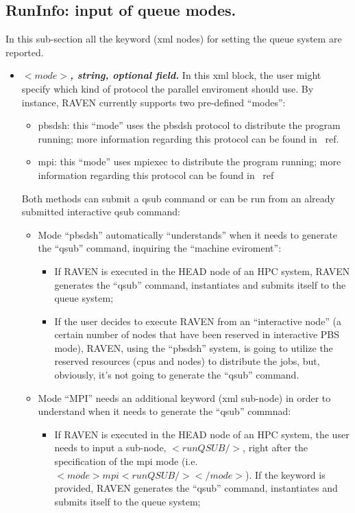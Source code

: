 \subsection{RunInfo: input of queue modes.}
\label{subsec:runinfoModes}
In this sub-section all  the keyword (xml nodes) for setting the queue system are reported.
\begin{itemize}
\item $<mode>$\textbf{\textit{, string, optional field.}} In this xml block, the user might specify which kind of protocol the parallel enviroment should use. By instance, RAVEN currently supports two pre-defined ``modes'':
  \begin{itemize}
    \item pbsdsh: this ``mode'' uses the pbsdsh protocol to distribute the program running; more information regarding this protocol can be found in ~ref{}. 
    \item mpi: this ``mode'' uses mpiexec to distribute the program running; more information regarding this protocol can be found in ~ref{}
   \end{itemize}
Both methods can submit a qsub command or can be run from an already submitted interactive qsub command:
     \begin{itemize}
        \item Mode ``pbsdsh'' automatically ``understands'' when it needs to generate the ``qsub'' command, inquiring the ``machine eviroment'': 
         \begin{itemize}         
           \item If RAVEN is executed in the HEAD node of an HPC system, RAVEN generates the ``qsub'' command, instantiates and submits itself to the queue system; 
           \item If the user decides to execute RAVEN from an ``interactive node'' (a certain number of nodes that have been reserved in interactive PBS mode), RAVEN, using the ``pbsdsh'' system, is going to utilize the reserved resources (cpus and nodes) to distribute the jobs, but, obviously, it's not going to generate the ``qsub'' command. 
         \end{itemize}
          \item Mode ``MPI'' needs an additional keyword (xml sub-node) in order to understand when it needs to generate the ``qsub'' commnad:
         \begin{itemize}         
           \item If RAVEN is executed in the HEAD node of an HPC system, the user needs to input a sub-node, $<runQSUB/>$, right after the specification of the mpi mode (i.e. $<mode>mpi<runQSUB/></mode>$). If the keyword is provided, RAVEN generates the ``qsub'' command, instantiates and submits itself to the queue system; 

\end{itemize}
\end{itemize}
\end{itemize}
